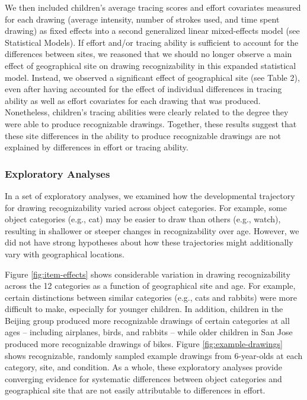\documentclass[
  man]{apa6}
\begin{document}
We then included children's average tracing scores and effort covariates measured for each drawing (average intensity, number of strokes used, and time spent drawing) as fixed effects into a second generalized linear mixed-effects model (see Statistical Models).
If effort and/or tracing ability is sufficient to account for the differences between sites, we reasoned that we should no longer observe a main effect of geographical site on drawing recognizability in this expanded statistical model.
Instead, we observed a significant effect of geographical site (see Table 2), even after having accounted for the effect of individual differences in tracing ability as well as effort covariates for each drawing that was produced. Nonetheless, children's tracing abilities were clearly related to the degree they were able to produce recognizable drawings. Together, these results suggest that these site differences in the ability to produce recognizable drawings are not explained by differences in effort or tracing ability.

\hypertarget{exploratory-analyses}{%
\subsubsection{Exploratory Analyses}\label{exploratory-analyses}}

In a set of exploratory analyses, we examined how the developmental trajectory for drawing recognizability varied across object categories. For example, some object categories (e.g., cat) may be easier to draw than others (e.g., watch), resulting in shallower or steeper changes in recognizability over age. However, we did not have strong hypotheses about how these trajectories might additionally vary with geographical locations.

Figure \ref{fig:item-effects} shows considerable variation in drawing recognizability across the 12 categories as a function of geographical site and age. For example, certain distinctions between similar categories (e.g., cats and rabbits) were more difficult to make, especially for younger children. In addition, children in the Beijing group produced more recognizable drawings of certain categories at all ages -- including airplanes, birds, and rabbits -- while older children in San Jose produced more recognizable drawings of bikes. Figure \ref{fig:example-drawings} shows recognizable, randomly sampled example drawings from 6-year-olds at each category, site, and condition. As a whole, these exploratory analyses provide converging evidence for systematic differences between object categories and geographical site that are not easily attributable to differences in effort.
\end{document}
